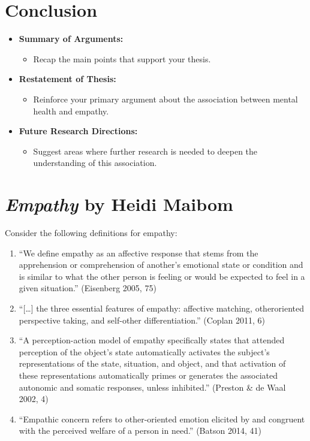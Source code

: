 \documentclass[stu]{apa7}
\begin{document}
\section{Conclusion}
\begin{itemize}
    \item \textbf{Summary of Arguments:}
        \begin{itemize}
            \item Recap the main points that support your thesis.
        \end{itemize}
    \item \textbf{Restatement of Thesis:}
        \begin{itemize}
            \item Reinforce your primary argument about the association between mental health and empathy.
        \end{itemize}
    \item \textbf{Future Research Directions:}
        \begin{itemize}
            \item Suggest areas where further research is needed to deepen the understanding of this association.
        \end{itemize}
\end{itemize}

\newpage

\section{\textit{Empathy} by Heidi Maibom}

Consider the following definitions for empathy:

\begin{enumerate}[label=(D\arabic*)]
    \item ``We define empathy as an affective response that stems from the
    apprehension or comprehension of another's emotional state or condition
    and is similar to what the other person is feeling or would be
    expected to feel in a given situation.'' (Eisenberg 2005, 75)
    \item ``[\dots] the three essential features of empathy: affective matching, otheroriented
    perspective taking, and self-other differentiation.'' (Coplan 2011, 6)
    \item ``A perception-action model of empathy specifically states that attended
    perception of the object's state automatically activates the subject's representations
    of the state, situation, and object, and that activation of these
    representations automatically primes or generates the associated autonomic
    and somatic responses, unless inhibited.'' (Preston \& de Waal 2002, 4)
    \item ``Empathic concern refers to other-oriented emotion elicited by and
    congruent with the perceived welfare of a person in need.'' (Batson 2014, 41)
\end{enumerate}
\end{document}
